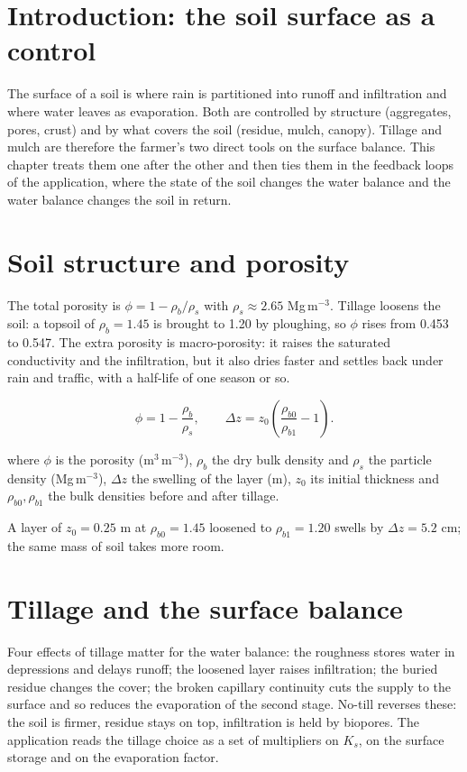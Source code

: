 \section{Introduction: the soil surface as a control}
The surface of a soil is where rain is partitioned into runoff and infiltration and where water leaves as evaporation. Both are controlled by structure (aggregates, pores, crust) and by what covers the soil (residue, mulch, canopy). Tillage and mulch are therefore the farmer's two direct tools on the surface balance. This chapter treats them one after the other and then ties them in the feedback loops of the application, where the state of the soil changes the water balance and the water balance changes the soil in return.

\section{Soil structure and porosity}
The total porosity is $\phi=1-\rho_b/\rho_s$ with $\rho_s\approx2.65$ Mg\,m$^{-3}$. Tillage loosens the soil: a topsoil of $\rho_b=1.45$ is brought to 1.20 by ploughing, so $\phi$ rises from 0.453 to 0.547. The extra porosity is macro-porosity: it raises the saturated conductivity and the infiltration, but it also dries faster and settles back under rain and traffic, with a half-life of one season or so.

\begin{equation}\phi=1-\frac{\rho_b}{\rho_s},\qquad \Delta z=z_0\left(\frac{\rho_{b0}}{\rho_{b1}}-1\right).\end{equation}
\par\noindent where $\phi$ is the porosity (m$^3$\,m$^{-3}$), $\rho_b$ the dry bulk density and $\rho_s$ the particle density (Mg\,m$^{-3}$), $\Delta z$ the swelling of the layer (m), $z_0$ its initial thickness and $\rho_{b0},\rho_{b1}$ the bulk densities before and after tillage.



A layer of $z_0=0.25$ m at $\rho_{b0}=1.45$ loosened to $\rho_{b1}=1.20$ swells by $\Delta z=5.2$ cm; the same mass of soil takes more room.

\section{Tillage and the surface balance}
Four effects of tillage matter for the water balance: the roughness stores water in depressions and delays runoff; the loosened layer raises infiltration; the buried residue changes the cover; the broken capillary continuity cuts the supply to the surface and so reduces the evaporation of the second stage. No-till reverses these: the soil is firmer, residue stays on top, infiltration is held by biopores. The application reads the tillage choice as a set of multipliers on $K_s$, on the surface storage and on the evaporation factor.

